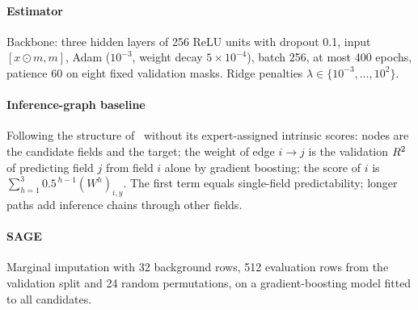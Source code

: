 \paragraph{Estimator} Backbone: three hidden layers of 256 ReLU units with dropout 0.1, input
$[x\odot m, m]$, Adam ($10^{-3}$, weight decay $5\times10^{-4}$), batch 256, at most 400 epochs,
patience 60 on eight fixed validation masks. Ridge penalties $\lambda\in\{10^{-3},\dots,10^{2}\}$.

\paragraph{Inference-graph baseline} Following the structure of~\cite{hu2026ignn} without its
expert-assigned intrinsic scores: nodes are the candidate fields and the target; the weight of edge
$i\to j$ is the validation $R^{2}$ of predicting field $j$ from field $i$ alone by gradient boosting; the
score of $i$ is $\sum_{h=1}^{3}0.5^{\,h-1}(W^{h})_{i,y}$. The first term equals single-field
predictability; longer paths add inference chains through other fields.

\paragraph{SAGE} Marginal imputation with 32 background rows, 512 evaluation rows from the
validation split and 24 random permutations, on a gradient-boosting model fitted to all candidates.


